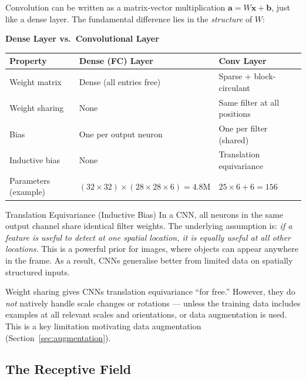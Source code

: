 \documentclass[11pt,a4paper]{article}
\begin{document}
Convolution can be written as a matrix-vector multiplication $\mathbf{a} = W\mathbf{x} + \mathbf{b}$, just like a dense layer. The fundamental difference lies in the \emph{structure} of $W$:

\begin{tcolorbox}[colback=LightBlue,colframe=AccentBlue,boxrule=0.8pt,arc=3pt]
\textbf{Dense Layer vs.\ Convolutional Layer}\\[4pt]
\begin{tabular}{@{}lll@{}}
\toprule
\textbf{Property} & \textbf{Dense (FC) Layer} & \textbf{Conv Layer} \\
\midrule
Weight matrix & Dense (all entries free) & Sparse + block-circulant \\
Weight sharing & None & Same filter at all positions \\
Bias & One per output neuron & One per filter (shared) \\
Inductive bias & None & Translation equivariance \\
Parameters (example) & $(32\!\times\!32)\!\times\!(28\!\times\!28\!\times\!6) = 4.8\text{M}$ & $25\!\times\!6 + 6 = 156$ \\
\bottomrule
\end{tabular}
\end{tcolorbox}

\begin{defbox}{Translation Equivariance (Inductive Bias)}
In a CNN, all neurons in the same output channel share identical filter weights. The underlying assumption is: \emph{if a feature is useful to detect at one spatial location, it is equally useful at all other locations}. This is a powerful prior for images, where objects can appear anywhere in the frame. As a result, CNNs generalise better from limited data on spatially structured inputs.
\end{defbox}

\begin{insightbox}
Weight sharing gives CNNs translation equivariance ``for free.'' However, they do \emph{not} natively handle scale changes or rotations — unless the training data includes examples at all relevant scales and orientations, or data augmentation is used. This is a key limitation motivating data augmentation (Section~\ref{sec:augmentation}).
\end{insightbox}

\subsection{The Receptive Field}
\label{sec:receptive_field}
\end{document}
